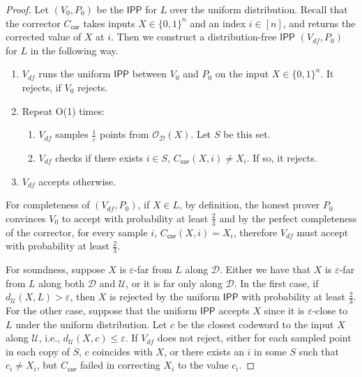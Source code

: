 \documentclass[11pt]{article}
\newcommand{\IPP}{\mathsf{IPP}}
\newcommand{\sU}{\mathcal{U}}
\newcommand{\sD}{\mathcal{D}}
\newcommand{\sO}{\mathcal{O}}
\begin{document}
\begin{proof}
Let $(V_0, P_0)$ be the $\IPP$ for $L$ over the uniform distribution. Recall that the corrector $C_{\mathsf{cor}}$ takes inputs $X \in \{0,1\}^{n} $ and an index $i \in [n]$, and returns the corrected value of $X$ at $i$.  Then we construct a distribution-free $\IPP$ $(V_{df}, P_0)$ for $L$ in the following way.

\begin{algorithm}
\label{pcl:rlcc_dfipp}
\caption{Distribution-free $\IPP$ for a subset of an RLCC $C$, with corrector $C_{\mathsf{cor}}$.}
\label{RLCCDFIPP}
\begin{enumerate}
    \item $V_{df}$ runs the uniform $\IPP$ between $V_0$ and $P_0$ on the input $X \in \{0,1\}^n$. It rejects, if $V_{0}$ rejects.
    \item \label{it:4repsrlcc} Repeat O(1) times:
        \begin{enumerate}
            \item \label{it:samplerlcc} $V_{df}$ samples $\frac{1}{\varepsilon}$ points from $\sO_\mathcal{D}(X)$. Let $S$ be this set.
            \item $V_{df}$ checks if there exists $i \in S$, $C_{\mathsf{cor}}(X, i) \neq X_{i}$. If so, it rejects. 
    \end{enumerate}
\item $V_{df}$ accepts otherwise.
\end{enumerate}
\end{algorithm}

For completeness of $(V_{df}, P_0)$, if $X\in L$, by definition, the honest prover $P_0$ convinces $V_0$ to accept with probability at least $\frac{2}{3}$ and by the perfect completeness of the corrector, for every sample $i$, $C_{\mathsf{cor}}(X,i)=X_{i}$, therefore $V_{df}$ must accept with probability at least $\frac{2}{3}$.  

For soundness, suppose $X$ is $\varepsilon$-far from $L$ along $\sD$. Either we have that $X$ is $\varepsilon$-far from $L$ along both $\sD$ and $\sU$, or it is far only along $\sD$. In the first case, if $d_{\mathcal{U}}(X,L)>\varepsilon$, then $X$ is rejected by the uniform $\IPP$ with probability at least $\frac{2}{3}$. For the other case, suppose that the uniform $\IPP$ accepts $X$ since it is $\varepsilon$-close to $L$ under the uniform distribution. Let $c$ be the closest codeword to the input $X$ along $\sU$, i.e., $d_{\sU}(X,c)\leq \varepsilon$. If $V_{df}$ does not reject, either for each sampled point in each copy of $S$, $c$ coincides with $X$, or there exists an $i$ in some $S$ such that $c_i \neq X_i$, but $C_{\mathsf{cor}}$ failed in correcting $X_{i}$ to the value $c_i$.


\end{proof}
\end{document}
